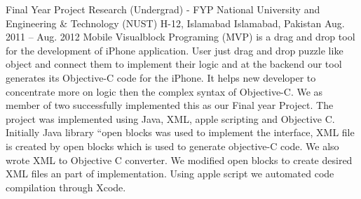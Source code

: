 \begin{cventries}
  \cventry
    {Final Year Project Research (Undergrad) - FYP} %
    {National University and Engineering \& Technology (NUST) H-12, Islamabad} %
    {Islamabad, Pakistan} %
    {Aug. 2011 – Aug. 2012} %
    {
		Mobile Visualblock Programing (MVP) is a drag and drop tool for the development of iPhone application.
		User just drag and drop puzzle like object and connect them to implement their logic and at the backend
		our tool generates its Objective-C code for the iPhone.
		It helps new developer to concentrate more on logic then the complex syntax of Objective-C.
		We as member of two successfully implemented this as our Final year Project. The project was implemented using 
		Java, XML, apple scripting and Objective C. Initially Java library “open blocks was used to implement the interface,
		XML file is created by open blocks which is used to generate objective-C code. We also wrote XML to Objective C converter.
		We modified open blocks to create desired XML files an part of implementation. Using apple script we automated
		code compilation through Xcode.
    }

\end{cventries}
